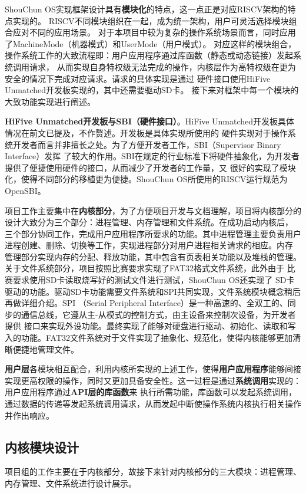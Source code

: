 \documentclass[UTF8,a4paper,10pt]{ctexart}
\begin{document}
ShouChun OS实现框架设计具有\textbf{模块化}的特点，这一点正是对应RISCV架构的特点实现的。
RISCV不同模块组织在一起，成为统一架构，用户可灵活选择模块组合应对不同的应用场景。
对于本项目中较为复杂的操作系统场景而言，同时应用了MachineMode（机器模式）和UserMode（用户模式）。
对应这样的模块组合，操作系统工作的大致流程即：用户应用程序通过库函数（静态或动态链接）发起系统调用请求，
从而实现自身特权级无法完成的操作，内核层作为高特权级在更为安全的情况下完成对应请求。请求的具体实现是通过
硬件接口使用HiFive Unmatched开发板实现的，其中还需要驱动SD卡。
接下来对框架中每一个模块的大致功能实现进行阐述。

\textbf{HiFive Unmatched开发板与SBI（硬件接口）}。HiFive Unmatched开发板具体情况在前文已提及，不作赘述。开发板是具体实现所使用的
硬件实现对于操作系统开发者而言并非擅长之处。为了方便开发者工作，SBI（Supervisor Binary Interface）发挥
了较大的作用。SBI在规定的行业标准下将硬件抽象化，为开发者提供了便捷使用硬件的接口，从而减少了开发者的工作量，又
很好的实现了模块化，使得不同部分的移植更为便捷。ShouChun OS所使用的RISCV运行规范为OpenSBI。

项目工作主要集中在\textbf{内核部分}，为了方便项目开发与文档理解，项目将内核部分的设计大致分为三个部分：进程管理、内存管理和文件系统。在成功启动内核后，
三个部分协同工作，完成用户应用程序所要求的功能。其中进程管理主要负责用户进程创建、删除、切换等工作，实现进程部分对用户进程相关请求的相应。内存
管理部分实现内存的分配、释放功能，其中包含有页表相关功能以及堆栈的管理。关于文件系统部分，项目按照比赛要求实现了FAT32格式文件系统，此外由于
比赛要求使用SD卡读取烧写好的测试文件进行测试，ShouChun OS还实现了
SD卡驱动的功能。驱动SD卡功能需要文件系统和SPI共同实现，文件系统模块概念稍后再做详细介绍。SPI
（Serial Peripheral Interface）是一种高速的、全双工的、同步的通信总线，它遵从主-从模式的控制方式，由主设备来控制次设备，为开发者提供
接口来实现外设功能。最终实现了能够对硬盘进行驱动、初始化、读取和写入的功能。FAT32文件系统对于文件实现了抽象化、规范化，使得内核能够更加清晰便捷地管理文件。

\textbf{用户层}各模块相互配合，利用内核所实现的上述工作，使得\textbf{用户应用程序}能够间接实现更高权限的操作，同时又更加具备安全性。这一过程是通过\textbf{系统调用}实现的：
用户应用程序通过\textbf{API层的库函数}来
执行所需功能，库函数可以发起系统调用，通过数据的传递等发起系统调用请求，从而发起中断使操作系统内核执行相关操作并作出响应。

\subsection{内核模块设计}
项目组的工作主要在于内核部分，故接下来针对内核部分的三大模块：进程管理、内存管理、文件系统进行设计展示。
\end{document}
